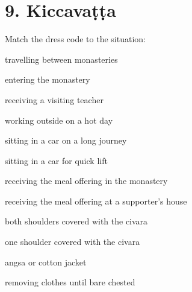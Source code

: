 \chapter{9. Kiccavaṭṭa}
\renewcommand*{\theChapterTitle}{9. Kiccavaṭṭa}

\begin{exam}{\autoExamName}

\begin{problem*}

  Match the dress code to the situation:

  \bigskip

  \begin{multicols}{2}

    \begin{parts}

    \item \fillin{2cm}{\ref{both}} travelling between monasteries
    \item \fillin{2cm}{\ref{one}} entering the monastery
    \item \fillin{2cm}{\ref{one}} receiving a visiting teacher
    \item \fillin{2cm}{\ref{angsa}} working outside on a hot day
    \item \fillin{2cm}{\ref{both}} sitting in a car on a long journey
    \item \fillin{2cm}{\ref{both}} sitting in a car for quick lift
    \item \fillin{2cm}{\ref{one}} receiving the meal offering in the monastery
    \item \fillin{2cm}{\ref{both}} receiving the meal offering at a supporter's house

    \columnbreak

    \bMatchChoices

    \item\label{both} both shoulders covered with the civara
    \item\label{one} one shoulder covered with the civara
    \item\label{angsa} angsa or cotton jacket
    \item\label{bare} removing clothes until bare chested

    \eMatchChoices

    \end{parts}
  
  \end{multicols}

\end{problem*}


\end{exam}
